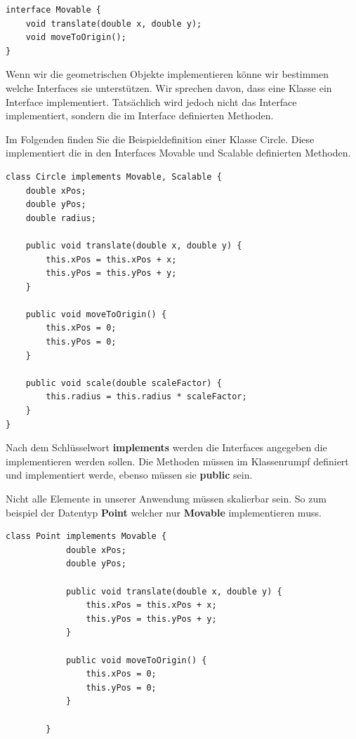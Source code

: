 \documentclass[12pt]{article}
\begin{document}
    \begin{lstlisting}[caption=Movable]
interface Movable {
    void translate(double x, double y);
    void moveToOrigin();
}
    \end{lstlisting}

    Wenn wir die geometrischen Objekte implementieren könne wir bestimmen welche Interfaces sie unterstützen. 
    Wir sprechen davon, dass eine Klasse ein Interface implementiert. Tatsächlich wird jedoch nicht das Interface implementiert, 
    sondern die im Interface definierten Methoden.

    Im Folgenden finden Sie die Beispieldefinition einer Klasse Circle. 
    Diese implementiert die in den Interfaces Movable und Scalable definierten Methoden.


    \begin{lstlisting}[caption=Circle]
class Circle implements Movable, Scalable {
    double xPos;
    double yPos;
    double radius;

    public void translate(double x, double y) {
        this.xPos = this.xPos + x;
        this.yPos = this.yPos + y;
    }

    public void moveToOrigin() {
        this.xPos = 0;
        this.yPos = 0;
    }

    public void scale(double scaleFactor) {
        this.radius = this.radius * scaleFactor;
    }
}
    \end{lstlisting}

    Nach dem Schlüsselwort \textbf{implements} werden die Interfaces angegeben die implementieren werden sollen. 
    Die Methoden müssen im Klassenrumpf definiert und implementiert werde, ebenso müssen sie \textbf{public} sein. 

    Nicht alle Elemente in unserer Anwendung müssen skalierbar sein. So zum beispiel der Datentyp \textbf{Point} welcher nur \textbf{Movable} implementieren muss. 

    \begin{lstlisting}[caption=Point]
        class Point implements Movable {
            double xPos;
            double yPos;

            public void translate(double x, double y) {
                this.xPos = this.xPos + x;
                this.yPos = this.yPos + y;
            }

            public void moveToOrigin() {
                this.xPos = 0;
                this.yPos = 0;
            }

        }
    \end{lstlisting}
\end{document}
